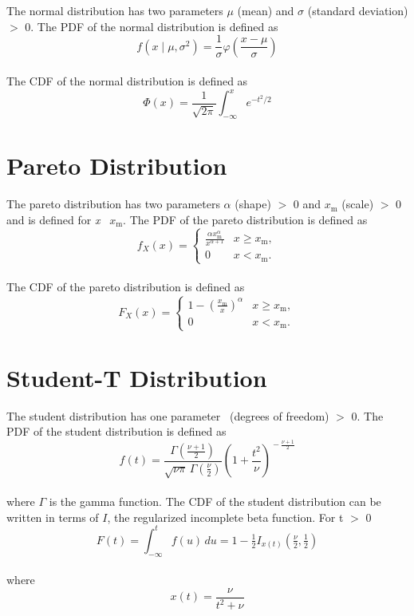 		The normal distribution has two parameters $\mu$ (mean) and $\sigma$ (standard deviation) $>$ 0. The \ac{PDF} of the normal distribution is defined as
		\\
		$$f(x \mid \mu, \sigma^2) =\frac 1 \sigma \varphi\left(\frac{x-\mu} \sigma \right)$$
		\\
		The \ac{CDF} of the normal distribution is defined as
		\\
		$$\Phi(x) = \frac 1 {\sqrt{2\pi}} \int_{-\infty}^x e^{-t^2/2}$$

	\section{Pareto Distribution}
	
		The pareto distribution has two parameters $\alpha$ (shape) $>$ 0 and $x_\mathrm{m}$ (scale) $>$ 0 and is defined for \textit{x} \geq\ $x_\mathrm{m}$. The \ac{PDF} of the pareto distribution is defined as
		\\
		$$f_X(x)= \begin{cases} \frac{\alpha x_\mathrm{m}^\alpha}{x^{\alpha+1}} & x \ge x_\mathrm{m}, \\ 0 & x < x_\mathrm{m}. \end{cases}$$
		\\
		The \ac{CDF} of the pareto distribution is defined as
		\\
		$$F_X(x) = \begin{cases}1-\left(\frac{x_\mathrm{m}}{x}\right)^\alpha & x \ge x_\mathrm{m}, \\0 & x < x_\mathrm{m}.\end{cases}$$

	\section{Student-T Distribution}
	
		The student distribution has one parameter \nu\ (degrees of freedom) $>$ 0. The \ac{PDF} of the student distribution is defined as
		\\
		$$f(t) = \frac{\Gamma(\frac{\nu+1}{2})} {\sqrt{\nu\pi}\,\Gamma(\frac{\nu}{2})} \left(1+\frac{t^2}{\nu} \right)^{\!-\frac{\nu+1}{2}}$$
		\\
		where $\Gamma$ is the gamma function. The \ac{CDF} of the student distribution can be written in terms of $I$, the regularized incomplete beta function. For t $>$ 0
		\\
		$$F(t) = \int_{-\infty}^t f(u)\,du = 1 - \tfrac{1}{2} I_{x(t)}\left(\tfrac{\nu}{2}, \tfrac{1}{2}\right)$$
		\\
		where $$x(t) = \frac{\nu}{{t^2+\nu}}$$

